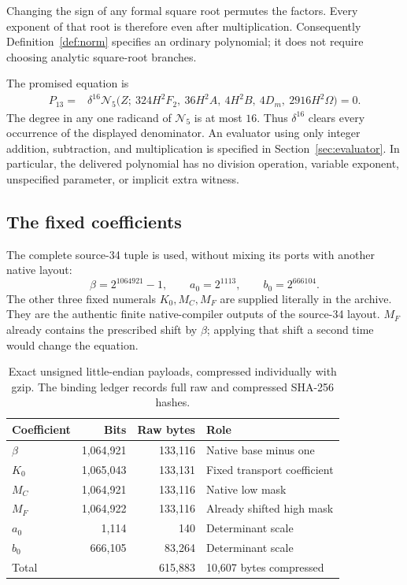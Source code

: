 \documentclass[11pt]{article}
\theoremstyle{definition}
\theoremstyle{remark}
\newcommand{\Norm}{\mathcal N}
\begin{document}
Changing the sign of any formal square root permutes the factors.
Every exponent of that root is therefore even after multiplication.
Consequently Definition~\ref{def:norm} specifies an ordinary polynomial;
it does not require choosing analytic square-root branches.

The promised equation is
\begin{equation}
\boxed{\begin{aligned}
 P_{13}={}&\delta^{16}\Norm_5\bigl(
 Z;\ 324H^2F_2,\ 36H^2A,\ 4H^2B,\ 4D_m,\ 2916H^2\Omega
 \bigr)=0.
\end{aligned}}\label{eq:P13}
\end{equation}
The degree in any one radicand of \(\Norm_5\) is at most \(16\).
Thus \(\delta^{16}\) clears every occurrence of the displayed denominator.
An evaluator using only integer addition, subtraction, and multiplication
is specified in Section~\ref{sec:evaluator}. In particular, the delivered
polynomial has no division operation, variable exponent, unspecified
parameter, or implicit extra witness.

\subsection{The fixed coefficients}
\label{sec:coefficients}

The complete source-34 tuple is used, without mixing its ports with
another native layout:
\[
 \beta=2^{1064921}-1,\qquad
 a_0=2^{1113},\qquad b_0=2^{666104}.
\]
The other three fixed numerals \(K_0,M_C,M_F\) are supplied literally in
the archive. They are the authentic finite native-compiler outputs of
the source-34 layout. \(M_F\) already contains the prescribed shift by
\(\beta\); applying that shift a second time would change the equation.

\begin{table}[ht]
\centering
\begin{tabular}{@{}lrrl@{}}
\toprule
Coefficient & Bits & Raw bytes & Role\\
\midrule
\(\beta\) & 1,064,921 & 133,116 & Native base minus one\\
\(K_0\) & 1,065,043 & 133,131 & Fixed transport coefficient\\
\(M_C\) & 1,064,921 & 133,116 & Native low mask\\
\(M_F\) & 1,064,922 & 133,116 & Already shifted high mask\\
\(a_0\) & 1,114 & 140 & Determinant scale\\
\(b_0\) & 666,105 & 83,264 & Determinant scale\\
\midrule
Total & & 615,883 & 10,607 bytes compressed\\
\bottomrule
\end{tabular}
\caption{Exact unsigned little-endian payloads, compressed individually
with gzip. The binding ledger records full raw and compressed SHA-256 hashes.}
\label{tab:coefficients}
\end{table}
\end{document}
